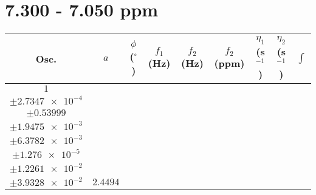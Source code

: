 \documentclass[8pt]{article}
\begin{document}
\section*{7.300 - 7.050 ppm}
\begin{longtable}[l]{c c c c c c c c c}
\toprule
Osc. & $a$ & $\phi$ ($^{\circ}$) & $f_1$ (Hz) & $f_2$ (Hz) & $f_2$ (ppm) & $\eta_1$ (s$^{-1}$) & $\eta_2$ (s$^{-1}$) & $\int$\\
\midrule
$\num{1}$ & \begin{tabular}[c]{@{}c@{}}$\num{2.8684e-2}$ \\ $\pm\num{2.7347e-4}$\end{tabular} & \begin{tabular}[c]{@{}c@{}}$\num{-0.54976}$ \\ $\pm\num{0.53999}$\end{tabular} & \begin{tabular}[c]{@{}c@{}}$\num{-7.9106}$ \\ $\pm\num{1.9475e-3}$\end{tabular} & \begin{tabular}[c]{@{}c@{}}$\num{3.5396e+3}$ \\ $\pm\num{6.3782e-3}$\end{tabular} & \begin{tabular}[c]{@{}c@{}}$\num{7.0811}$ \\ $\pm\num{1.276e-5}$\end{tabular} & \begin{tabular}[c]{@{}c@{}}$\num{1.1594}$ \\ $\pm\num{1.2261e-2}$\end{tabular} & \begin{tabular}[c]{@{}c@{}}$\num{4.2234}$ \\ $\pm\num{3.9328e-2}$\end{tabular} & $\num{2.4494}$\\

\end{longtable}
\end{document}
